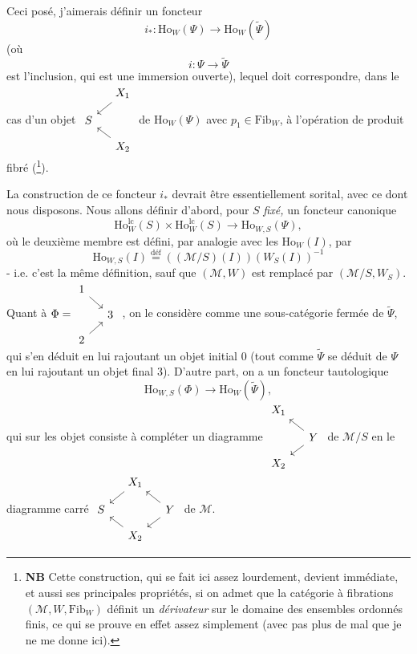 \documentclass[11pt]{article}
\newcommand{\printedpage}[1]{\marginpar{\footnotesize p.~#1}}
\newcommand{\msp}[1]{\marginpar{\footnotesize [#1]}}
\newcommand{\Ho}{\mathrm{Ho}}
\newcommand{\lc}{\mathrm{lc}}
\begin{document}
Ceci posé, j'aimerais définir un foncteur
\[
i_* : \Ho_W(\Psi) \longrightarrow \Ho_W(\tilde{\Psi})
\]
(où
\[
i : \Psi \longrightarrow \tilde{\Psi}
\]
est l'inclusion, qui est une immersion ouverte), lequel doit correspondre, dans le cas d'un objet $\vcenter{\hbox{\begin{tikzcd}[ampersand replacement=\&, row sep=small, column sep=small]
 \& X_1 \arrow[dl] \\
S \& \\
 \& X_2 \arrow[ul]
\end{tikzcd}}}$ de $\Ho_W(\Psi)$ avec $p_1 \in \mathrm{Fib}_W$, à l'opération de produit fibré (\footnote[131]{\textbf{NB} Cette construction, qui se fait ici assez lourdement, devient immédiate, et aussi ses principales propriétés, si on admet que la catégorie à fibrations $(\mathcal{M}, W, \mathrm{Fib}_W)$ définit un \textit{dérivateur} sur le domaine des ensembles ordonnés finis, ce qui se prouve en effet assez simplement (avec pas plus de mal que je ne me donne ici).}).

\printedpage{158}

\msp{page 244}
La construction de ce foncteur $i_*$ devrait être essentiellement sorital, avec ce dont nous disposons. Nous allons définir d'abord, pour $S$ \textit{fixé,} un foncteur canonique
\[
\Ho^{\lc}_W(S) \times \Ho^{\lc}_W(S) \longrightarrow \Ho_{W,S}(\Psi), \tag*{$(*)$}
\]
où le deuxième membre est défini, par analogie avec les $\Ho_W(I)$, par
\[
\Ho_{W,S}(I) \overset{\text{déf}}{=} ((\mathcal{M}/S)(I))(W_S(I))^{-1}
\]
- i.e. c'est la même définition, sauf que $(\mathcal{M}, W)$ est remplacé par $(\mathcal{M}/S, W_S)$. Quant à $\Phi = \vcenter{\hbox{\begin{tikzcd}[ampersand replacement=\&, row sep=small, column sep=small]
1 \arrow[dr] \& \\
 \& 3 \\
2 \arrow[ur] \&
\end{tikzcd}}}$ , on le considère comme une sous-catégorie fermée de $\tilde{\Psi}$, qui s'en déduit en lui rajoutant un objet initial 0 (tout comme $\tilde{\Psi}$ se déduit de $\Psi$ en lui rajoutant un objet final 3). D'autre part, on a un foncteur tautologique
\[
\Ho_{W,S}(\Phi) \longrightarrow \Ho_W(\tilde{\Psi}), \tag*{$(*')$}
\]
qui sur les objet consiste à compléter un diagramme $\vcenter{\hbox{\begin{tikzcd}[ampersand replacement=\&, row sep=small, column sep=small] %
X_1 \& \\
 \& Y \arrow[ul] \arrow[dl] \\
X_2 \&
\end{tikzcd}}}$ de $\mathcal{M}/S$ en le diagramme carré $\vcenter{\hbox{\begin{tikzcd}[ampersand replacement=\&, row sep=small, column sep=small]
 \& X_1 \arrow[dl] \& \\
S \& \& Y \arrow[ul] \arrow[dl] \\
 \& X_2 \arrow[ul] \&
\end{tikzcd}}}$ de $\mathcal{M}$.
\end{document}
